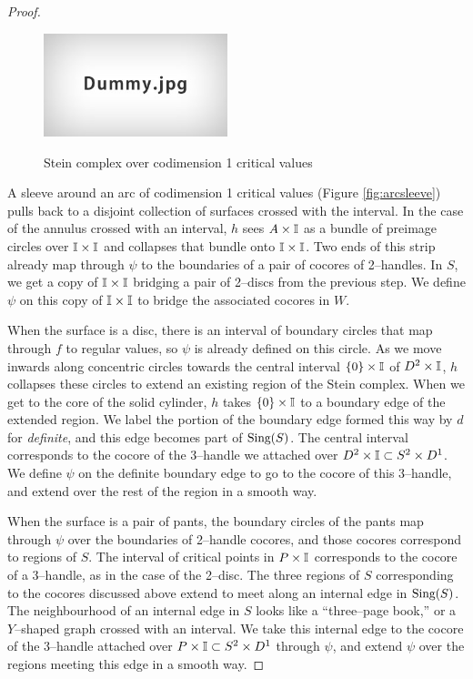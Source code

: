 \begin{proof}
	\begin{figure}
		\centering
		\captionsetup{justification=centering}
		\caption{Stein complex over codimension 1 critical values}
		\includegraphics[height=3cm]{figures/dummy.jpg}
		\label{fig:codim1stein}
	\end{figure}	
	
	A sleeve around an arc of codimension 1 critical values (Figure \ref{fig:arcsleeve}) pulls back to a disjoint collection of surfaces crossed with the interval.
	In the case of the annulus crossed with an interval, $h$ sees $A\times\mathbb{I}$ as a bundle of preimage circles over $\mathbb{I}\times\mathbb{I}$ and collapses that bundle onto $\mathbb{I}\times\mathbb{I}$.
	Two ends of this strip already map through $\psi$ to the boundaries of a pair of cocores of 2--handles.
	In $S$, we get a copy of $\mathbb{I}\times\mathbb{I}$ bridging a pair of 2--discs from the previous step.
	We define $\psi$ on this copy of $\mathbb{I}\times\mathbb{I}$ to bridge the associated cocores in $W$.
	
	When the surface is a disc, there is an interval of boundary circles that map through $f$ to regular values, so $\psi$ is already defined on this circle.
	As we move inwards along concentric circles towards the central interval $\{0\}\times\mathbb{I}$ of $D^2\times\mathbb{I}$, $h$ collapses these circles to extend an existing region of the Stein complex.
	When we get to the core of the solid cylinder, $h$ takes $\{0\}\times\mathbb{I}$ to a boundary edge of the extended region.
	We label the portion of the boundary edge formed this way by $d$ for \emph{definite}, and this edge becomes part of $\textrm{Sing}(S)$.
	The central interval corresponds to the cocore of the 3--handle we attached over $D^2\times\mathbb{I}\subset S^2\times D^1$.
	We define $\psi$ on the definite boundary edge to go to the cocore of this 3--handle, and extend over the rest of the region in a smooth way.
	
	When the surface is a pair of pants, the boundary circles of the pants map through $\psi$ over the boundaries of 2--handle cocores, and those cocores correspond to regions of $S$.
	The interval of critical points in $P\times\mathbb{I}$ corresponds to the cocore of a 3--handle, as in the case of the 2--disc.
	The three regions of $S$ corresponding to the cocores discussed above extend to meet along an internal edge in $\textrm{Sing}(S)$.
	The neighbourhood of an internal edge in $S$ looks like a ``three--page book,'' or a $Y$--shaped graph crossed with an interval.
	We take this internal edge to the cocore of the 3--handle attached over $P\times\mathbb{I}\subset S^2\times D^1$ through $\psi$, and extend $\psi$ over the regions meeting this edge in a smooth way.


\end{proof}
